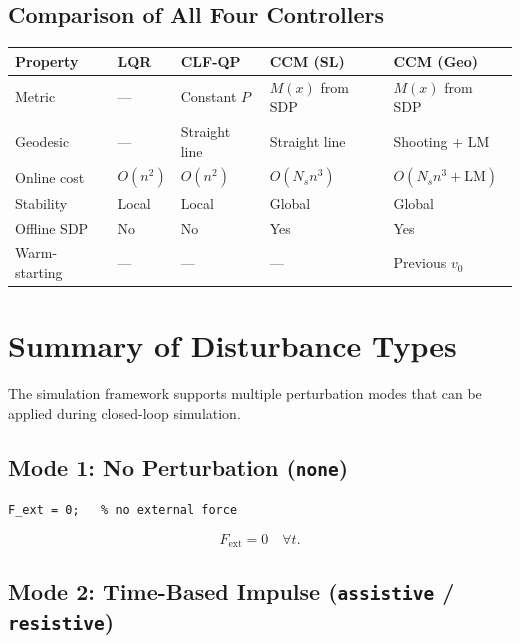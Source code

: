 \documentclass[11pt,a4paper]{article}
\begin{document}
\subsection{Comparison of All Four Controllers}

\begin{center}
\small
\begin{tabular}{>{\raggedright}p{3.2cm} p{2.2cm} p{2.5cm} p{2.2cm} p{2.8cm}}
\toprule
\textbf{Property} & \textbf{LQR} & \textbf{CLF-QP} & \textbf{CCM (SL)} & \textbf{CCM (Geo)} \\
\midrule
Metric             & --- & Constant \(P\) & \(M(x)\) from SDP & \(M(x)\) from SDP \\
Geodesic           & --- & Straight line & Straight line & Shooting + LM \\
Online cost        & \(O(n^2)\) & \(O(n^2)\) & \(O(N_s n^3)\) & \(O(N_s n^3 + \text{LM})\) \\
Stability          & Local & Local & Global & Global \\
Offline SDP        & No & No & Yes & Yes \\
Warm-starting      & --- & --- & --- & Previous \(v_0\) \\
\bottomrule
\end{tabular}
\end{center}


\section{Summary of Disturbance Types}
\label{sec:disturbance_types}

The simulation framework supports multiple perturbation modes that can be applied during closed-loop simulation.

\subsection{Mode 1: No Perturbation (\texttt{none})}

\begin{lstlisting}
F_ext = 0;   % no external force
\end{lstlisting}

\begin{codemath}
\[
F_{\mathrm{ext}} = 0 \quad \forall t.
\]
\end{codemath}

\subsection{Mode 2: Time-Based Impulse (\texttt{assistive} / \texttt{resistive})}
\end{document}
